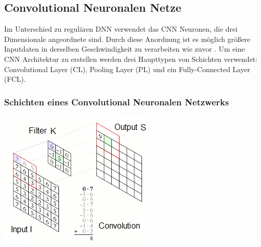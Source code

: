 \documentclass[twosided,a4,10pt]{article}
\begin{document}
\begin{multicols}{2}
		\subsection{Convolutional Neuronalen Netze}
		Im Unterschied zu regulären DNN verwendet das CNN Neuronen, die drei Dimensionale angeordnete sind. Durch diese Anordnung ist es möglich größere Inputdaten in derselben Geschwindigkeit zu verarbeiten wie zuvor \cite{karpathy}. Um eine CNN Architektur zu erstellen werden drei Haupttypen von Schichten verwendet: Convolutional Layer (CL), Pooling Layer (PL) und ein Fully-Connected Layer (FCL).
		
		\subsubsection{Schichten eines Convolutional Neuronalen Netzwerks}
		
		\begin{minipage}{0.45\textwidth}
			\centering
			\includegraphics{img/faltung2.png}
			\label{img:faltung}
		\end{minipage}\newline
	

\end{multicols}
\end{document}
